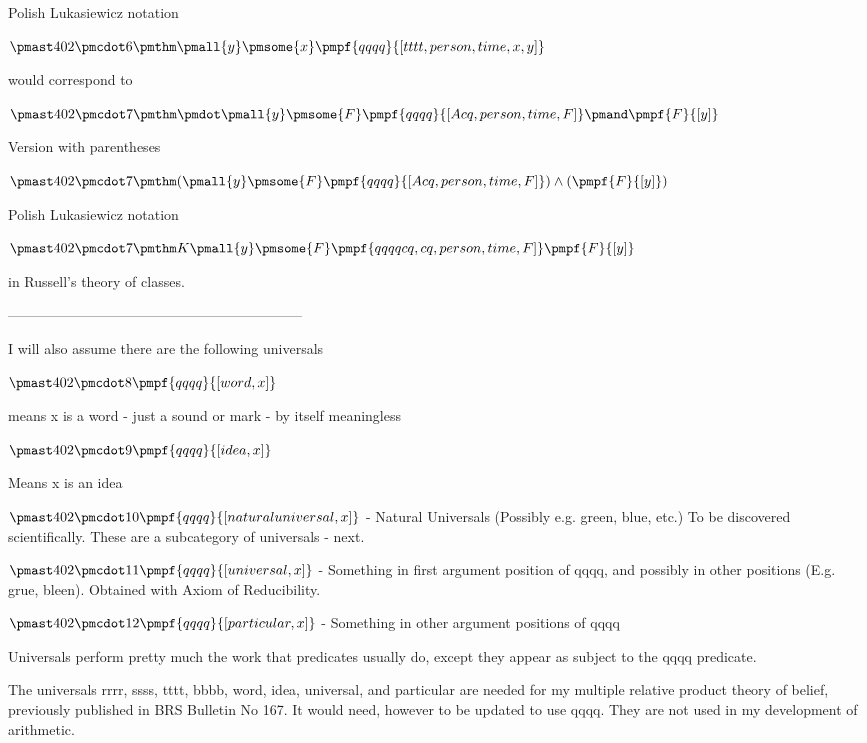 \documentclass[12pt]{article}
\begin{document}
Polish Lukasiewicz notation

$\pmast 402 \pmcdot 6 \pmthm \pmall{y}\pmsome{x}\pmpf{qqqq}{[tttt,   person,   time,   x,   y]}  $


would correspond to

$\pmast 402 \pmcdot 7 \pmthm \pmdot \pmall{y} \pmsome{F} \pmpf{qqqq}{[Acq, person,time,F]} \pmand \pmpf{F}{[y]} $
 
 

Version with parentheses

$\pmast 402 \pmcdot 7 \pmthm  (  \pmall{y}\pmsome{F} \pmpf{qqqq}{[Acq, person,time,F]} ) \land ( \pmpf{F}{[y]} )$


Polish Lukasiewicz notation

$\pmast 402 \pmcdot 7 \pmthm  K   \pmall{y}\pmsome{F}   \pmpf{qqqq  cq,   cq,   person,time,F]}   \pmpf{F}{[y]}  $


in Russell's theory of classes.

---------------------------------------------------------------

I will also assume there are the following universals

$\pmast 402 \pmcdot 8 \pmpf{qqqq}{[word, x]}$

means x is a word - just a sound or mark - by itself meaningless

$\pmast 402 \pmcdot 9 \pmpf{qqqq}{[idea, x]}$

Means x is an idea

$\pmast 402 \pmcdot 10 \pmpf{qqqq}{[naturaluniversal, x]}$ - Natural Universals (Possibly e.g. green, blue, etc.) To be discovered scientifically. These are a subcategory of universals - next.

$\pmast 402 \pmcdot 11 \pmpf{qqqq}{[universal, x]}$ - Something in first argument position of qqqq, and possibly in other positions (E.g. grue, bleen). Obtained with Axiom of Reducibility.

$\pmast 402 \pmcdot 12 \pmpf{qqqq}{[particular, x]}$ - Something in other argument positions of qqqq

Universals perform pretty much the work that predicates usually do, except they appear as subject to the qqqq predicate.

The universals rrrr, ssss, tttt, bbbb, word, idea, universal, and particular are needed for my multiple relative product theory of belief, previously published in BRS Bulletin No 167. It would need, however to be updated to use qqqq.
They are not used in my development of arithmetic.
\end{document}
